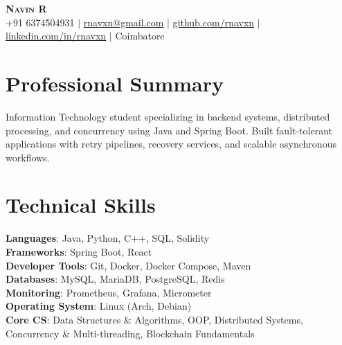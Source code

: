 \documentclass[letterpaper,11pt]{article}
\begin{document}

\begin{center}
    \textbf{\Huge \scshape Navin R} \\ \vspace{1pt}
    \small +91 6374504931 $|$ \href{mailto:rnavxn@gmail.com}{\underline{rnavxn@gmail.com}} $|$ 
    \href{https://github.com/rnavxn}{\underline{github.com/rnavxn}} $|$
    \href{https://linkedin.com/in/rnavxn}{\underline{linkedin.com/in/rnavxn}} $|$
    \small Coimbatore
\end{center}


\section{Professional Summary}
    \small{Information Technology student specializing in backend systems, distributed processing, and concurrency using Java and Spring Boot. Built fault-tolerant applications with retry pipelines, recovery services, and scalable asynchronous workflows.}


\section{Technical Skills}
 \begin{itemize}[leftmargin=0.15in, label={}]
    \small{\item{
     \textbf{Languages}{: Java, Python, C++, SQL, Solidity} \\
     \textbf{Frameworks}{: Spring Boot, React} \\
     \textbf{Developer Tools}{: Git, Docker, Docker Compose, Maven} \\
     \textbf{Databases}{: MySQL, MariaDB, PostgreSQL, Redis} \\
     \textbf{Monitoring}{: Prometheus, Grafana, Micrometer} \\     
     \textbf{Operating System}{: Linux (Arch, Debian)} \\
     \textbf{Core CS}{: Data Structures \& Algorithms, OOP, Distributed Systems,
         Concurrency \& Multi-threading, Blockchain Fundamentals}
    }}
\end{itemize}
\end{document}
